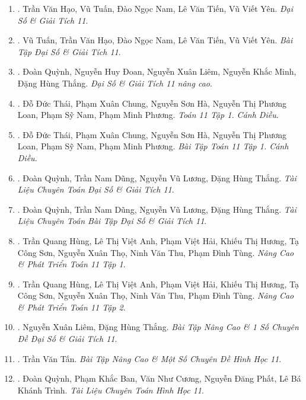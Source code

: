 \documentclass{article}
\begin{document}
\begin{enumerate}
	\item \cite{SGK_Toan_11_dai_so_giai_tich_co_ban}. {\sc Trần Văn Hạo, Vũ Tuấn, Đào Ngọc Nam, Lê Văn Tiến, Vũ Viết Yên}. {\it Đại Số \& Giải Tích 11}.
	
	\item \cite{SBT_Toan_11_dai_so_giai_tich_co_ban}. {\sc Vũ Tuấn, Trần Văn Hạo, Đào Ngọc Nam, Lê Văn Tiến, Vũ Viết Yên}. {\it Bài Tập Đại Số \& Giải Tích 11}.
	
	\item \cite{SGK_Toan_11_dai_so_giai_tich_nang_cao}. {\sc Đoàn Quỳnh, Nguyễn Huy Đoan, Nguyễn Xuân Liêm, Nguyễn Khắc Minh, Đặng Hùng Thắng}. {\it Đại Số \& Giải Tích 11 nâng cao}.
	
	\item \cite{SGK_Toan_11_CD_tap_2}. {\sc Đỗ Đức Thái, Phạm Xuân Chung, Nguyễn Sơn Hà, Nguyễn Thị Phương Loan, Phạm Sỹ Nam, Phạm Minh Phương}. {\it Toán 11 Tập 1. Cánh Diều}.
	
	\item \cite{SBT_Toan_11_CD_tap_2}. {\sc Đỗ Đức Thái, Phạm Xuân Chung, Nguyễn Sơn Hà, Nguyễn Thị Phương Loan, Phạm Sỹ Nam, Phạm Minh Phương}. {\it Bài Tập Toán 11 Tập 1. Cánh Diều}.
	
	\item \cite{TLCT_dai_so_giai_tich_11}. {\sc Đoàn Quỳnh, Trần Nam Dũng, Nguyễn Vũ Lương, Đặng Hùng Thắng}. {\it Tài Liệu Chuyên Toán Đại Số \& Giải Tích 11}.
	
	\item \cite{TLCT_BT_dai_so_giai_tich_11}. {\sc Đoàn Quỳnh, Trần Nam Dũng, Nguyễn Vũ Lương, Đặng Hùng Thắng}. {\it Tài Liệu Chuyên Toán Bài Tập Đại Số \& Giải Tích 11}.
	
	\item \cite{Hung_nang_cao_phat_trien_Toan_11_tap_1}. Trần Quang Hùng, Lê Thị Việt Anh, Phạm Việt Hải, Khiếu Thị Hương, Tạ Công Sơn, Nguyễn Xuân Thọ, Ninh Văn Thu, Phạm Đình Tùng. {\it Nâng Cao \& Phát Triển Toán 11 Tập 1}.\hfill{\sf[reading]}
	
	\item \cite{Hung_nang_cao_phat_trien_Toan_11_tap_2}. Trần Quang Hùng, Lê Thị Việt Anh, Phạm Việt Hải, Khiếu Thị Hương, Tạ Công Sơn, Nguyễn Xuân Thọ, Ninh Văn Thu, Phạm Đình Tùng. {\it Nâng Cao \& Phát Triển Toán 11 Tập 2}.\hfill{\sf[reading]}
	
	\item \cite{Liem_Thang2020}. Nguyễn Xuân Liêm, Đặng Hùng Thắng. {\it Bài Tập Nâng Cao \& 1 Số Chuyên Đề Đại Số \& Giải Tích 11}.\hfill{\sf[reading]}
	
	\item \cite{Tan2017}. Trần Văn Tấn. {\it Bài Tập Nâng Cao \& Một Số Chuyên Đề Hình Học 11}.\hfill{\sf[reading]}
	
	\item \cite{TLCT_hinh_hoc_11}. Đoàn Quỳnh, Phạm Khắc Ban, Văn Như Cương, Nguyễn Đăng Phất, Lê Bá Khánh Trình. {\it Tài Liệu Chuyên Toán Hình Học 11}.\hfill{\sf[reading]}	
\end{enumerate}
\end{document}
